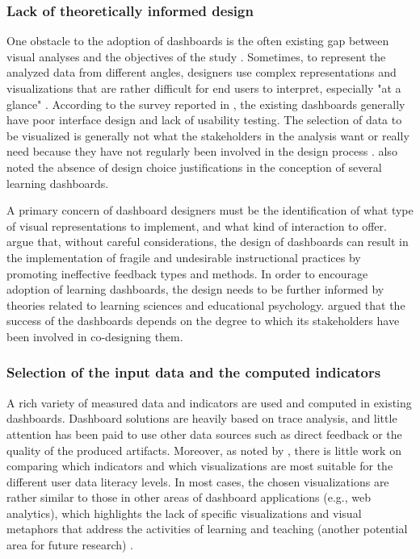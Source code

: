 \documentclass[preprint,12pt]{elsarticle}
\begin{document}
\subsubsection{Lack of theoretically informed design}
One obstacle to the adoption of dashboards is the often existing gap between visual analyses and the objectives of the study  \citep{Roberts2017}. 
Sometimes, to represent the analyzed data from different angles, designers use complex representations and visualizations that are rather difficult for end users to interpret, especially "at a glance" \citep{Duval2011}. According to the survey reported in \citep{Reimers2015}, the existing dashboards generally have poor interface design and lack of usability testing. The selection of data to be visualized is generally not what the stakeholders in the analysis want or really need because they have not regularly been involved in the design process \citep{Holstein2017}.
\citet{Bodily2017} also noted the absence of design choice justifications in the conception of several learning dashboards. 

A primary concern of dashboard designers must be the identification of what type of visual representations to implement, and what kind of interaction to offer. 
\citet{Gavsevic2015} argue that, without careful considerations, the design of dashboards can result in the implementation of fragile and undesirable instructional practices by promoting ineffective feedback types and methods. 
In order to encourage adoption of learning dashboards, the design needs to be further informed by theories related to learning sciences and educational psychology. \citet{Holstein2017} argued that the success of the dashboards depends on the degree to which its stakeholders have been involved in co-designing them. 


\subsubsection{Selection of the input data and the computed indicators}
A rich variety of measured data and indicators are used and computed in existing dashboards. 
Dashboard solutions are heavily based on trace analysis, and little attention has been paid to use other data sources such as direct feedback or the quality of the produced artifacts.
Moreover, as noted by \citet{Schwendimann2017}, there is little work on comparing which indicators and which visualizations are most suitable for the different user data literacy levels.
In most cases, the chosen visualizations are rather similar to those in other areas of dashboard applications (e.g., web analytics),
which highlights the lack of specific visualizations and visual metaphors that address the activities of learning and teaching (another potential area for future research) \citep{Schwendimann2017}.
\end{document}
